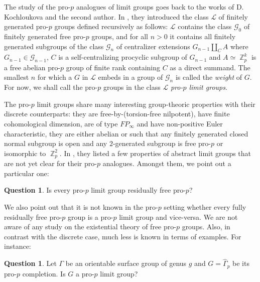 \documentclass[a4paper]{amsart}
\DeclareMathOperator{\bbz}{\mathbb{Z}}
\theoremstyle{definition}
\newtheorem{question}[thm]{Question}
\begin{document}
The study of the pro-\(p\) analogues of limit groups goes back to the works of D. Kochloukova and the second author. In \cite{kochloukovaPropAnaloguesLimit2011}, they introduced the class \(\mathcal{L}\) of finitely generated pro-\(p\)  groups defined recursively as follows: \(\mathcal{L}\) contains the class \(\mathcal{G}_0\) of finitely generated free pro-\(p\) groups, and for all \(n > 0\) it contains all finitely generated subgroups of the class \(\mathcal{G}_n\) of centralizer extensions \(G_{n-1} \amalg_C A\) where \(G_{n-1} \in \mathcal{G}_{n-1}\), \(C\) is a self-centralizing procyclic subgroup of \(G_{n-1}\) and \(A \simeq \bbz_p^k\) is a free abelian pro-\(p\) group of finite rank containing \(C\) as a direct summand. The smallest \(n\) for which a \(G\) in \(\mathcal{L}\) embeds in a group of \(\mathcal{G}_n\) is called the \emph{weight} of \(G\). For now, we shall call the pro-\(p\) groups in the class \(\mathcal{L}\) \emph{pro-\(p\) limit groups}. 

The pro-\(p\) limit groups share many interesting group-theoric properties with their discrete counterparts: they are free-by-(torsion-free nilpotent), have finite cohomological dimension, are of type \(FP_\infty\) and have non-positive Euler characteristic, they are either abelian or such that any finitely generated closed normal subgroup is open and any \(2\)-generated subgroup is free pro-\(p\) or isomorphic to \(\bbz_p^2\). In \cite{kochloukovaPropAnaloguesLimit2011}, they listed a few properties of abstract limit groups that are not yet clear for their pro-\(p\) analogues. Amongst them, we point out a particular one:

\begin{question}\label{quest-free-pro-p} Is every pro-\(p\) limit group residually free pro-\(p\)?
\end{question}

We also point out that it is not known in the pro-\(p\) setting whether every fully residually free pro-\(p\) group is a pro-\(p\) limit group and vice-versa. We are not aware of any study on the existential theory of free pro-\(p\) groups. Also, in contrast with the discrete case, much less is known in terms of examples. For instance:

\begin{question} Let \(\Gamma\) be an orientable surface group of genus \(g\) and \(G = \widehat{\Gamma}_p\) be its pro-\(p\) completion. Is \(G\) a pro-\(p\) limit group?
\end{question}
\end{document}
